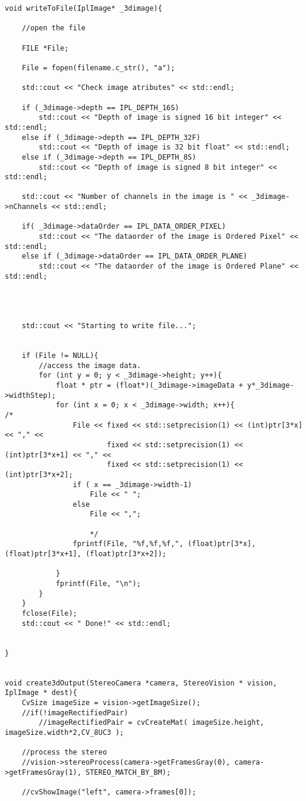 \begin{lstlisting}
void writeToFile(IplImage* _3dimage){

	//open the file

	FILE *File;

	File = fopen(filename.c_str(), "a");

	std::cout << "Check image atributes" << std::endl;

	if (_3dimage->depth == IPL_DEPTH_16S)
		std::cout << "Depth of image is signed 16 bit integer" << std::endl;
	else if (_3dimage->depth == IPL_DEPTH_32F)
		std::cout << "Depth of image is 32 bit float" << std::endl;
	else if (_3dimage->depth == IPL_DEPTH_8S)
		std::cout << "Depth of image is signed 8 bit integer" << std::endl;

	std::cout << "Number of channels in the image is " << _3dimage->nChannels << std::endl;

	if( _3dimage->dataOrder == IPL_DATA_ORDER_PIXEL)
		std::cout << "The dataorder of the image is Ordered Pixel" << std::endl;
	else if (_3dimage->dataOrder == IPL_DATA_ORDER_PLANE)
		std::cout << "The dataorder of the image is Ordered Plane" << std::endl;




	std::cout << "Starting to write file...";


	if (File != NULL){
		//access the image data.
		for (int y = 0; y < _3dimage->height; y++){
			float * ptr = (float*)(_3dimage->imageData + y*_3dimage->widthStep);
			for (int x = 0; x < _3dimage->width; x++){
/*
				File << fixed << std::setprecision(1) << (int)ptr[3*x] << "," <<
						fixed << std::setprecision(1) << (int)ptr[3*x+1] << "," <<
						fixed << std::setprecision(1) << (int)ptr[3*x+2];
				if ( x == _3dimage->width-1)
					File << " ";
				else
					File << ",";

					*/
				fprintf(File, "%f,%f,%f,", (float)ptr[3*x], (float)ptr[3*x+1], (float)ptr[3*x+2]);

			}
			fprintf(File, "\n");
		}
	}
	fclose(File);
	std::cout << " Done!" << std::endl;


}


void create3dOutput(StereoCamera *camera, StereoVision * vision, IplImage * dest){
	CvSize imageSize = vision->getImageSize();
	//if(!imageRectifiedPair)
		//imageRectifiedPair = cvCreateMat( imageSize.height, imageSize.width*2,CV_8UC3 );

	//process the stereo
	//vision->stereoProcess(camera->getFramesGray(0), camera->getFramesGray(1), STEREO_MATCH_BY_BM);

	//cvShowImage("left", camera->frames[0]);


\end{lstlisting}
